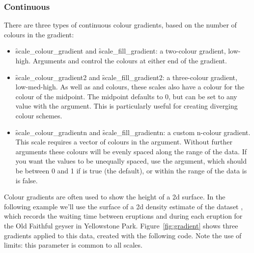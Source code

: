 \subsubsection{Continuous}
\label{ssub:colour-continuous}

There are three types of continuous colour gradients, based on the number of colours in the gradient:  

\begin{itemize}
  \item \f{scale_colour_gradient} and \f{scale_fill_gradient}: a two-colour gradient, low-high.  Arguments  and  control the colours at either end of the gradient.  

  \item \f{scale_colour_gradient2} and \f{scale_fill_gradient2}: a three-colour gradient, low-med-high.  As well as  and  colours, these scales also have a  colour for the colour of the midpoint.  The midpoint defaults to 0, but can be set to any value with the  argument.  This is particularly useful for creating diverging colour schemes. 

  \item \f{scale_colour_gradientn} and \f{scale_fill_gradientn}: a custom n-colour gradient.  This scale requires a vector of colours in the  argument.  Without further arguments these colours will be evenly spaced along the range of the data.  If you want the values to be unequally spaced, use the  argument, which should be between 0 and 1 if  is true (the default), or within the range of the data is  is false. 
\end{itemize}

Colour gradients are often used to show the height of a 2d surface.  In the following example we'll use the surface of a 2d density estimate of the  dataset \citep{azzalini:1990}, which records the waiting time between eruptions and during each eruption for the Old Faithful geyser in Yellowstone Park. Figure~\ref{fig:gradient} shows three gradients applied to this data, created with the following code.  Note the use of limits: this parameter is common to all scales.

